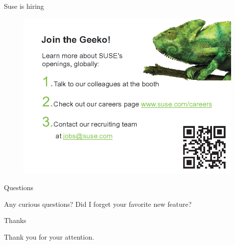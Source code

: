 \documentclass{beamer}
\begin{document}
\begin{frame}{Suse is hiring}
	\begin{figure}
	\includegraphics[width= 0.8\linewidth]{suse_hiring.png}
	\end{figure}
\end{frame}

\begin{frame}{Questions}
	\begin{center}
	Any curious questions? Did I forget your favorite new feature?
	\end{center}
\end{frame}

\begin{frame}{Thanks}
	\begin{center}
	Thank you for your attention.
	\end{center}
\end{frame}
\end{document}
